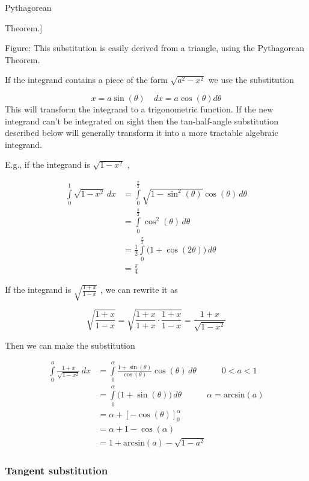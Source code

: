 
Pythagorean

Theorem.]


Figure: This substitution is easily derived from a triangle, using the Pythagorean Theorem.


If the integrand contains a piece of the form $\sqrt{a^2-x^2}$ we use the substitution


\[
x=a\sin(\theta)\quad dx=a\cos(\theta)d\theta
\] This will transform the integrand to a trigonometric function. If the new integrand can't be integrated on sight then the tan-half-angle substitution described below will generally transform it into a more tractable algebraic integrand.


E.g., if the integrand is $\sqrt{1-x^2}$ ,


\begin{align}
\int\limits_0^1\sqrt{1-x^2}\,dx &= \int\limits_0^\frac{\pi}{2}\sqrt{1-\sin^2(\theta)}\cos(\theta)\,d\theta \\&= \int\limits_0^\frac{\pi}{2}\cos^2(\theta)\,d\theta \\&= \tfrac{1}{2}\int\limits_0^\frac{\pi}{2}\bigl(1+\cos(2\theta)\bigr)\,d\theta \\&= \frac{\pi}{4}
\end{align}


If the integrand is $\sqrt{\frac{1+x}{1-x}}$ , we can rewrite it as


\[
\sqrt{\frac{1+x}{1-x}}=\sqrt{\frac{1+x}{1+x}\cdot\frac{1+x}{1-x}}=\frac{1+x}{\sqrt{1-x^2}}
\]

Then we can make the substitution


\begin{align}
\int\limits_0^a\frac{1+x}{\sqrt{1-x^2}}\,dx 
&= \int\limits_0^\alpha\frac{1+\sin(\theta)}{\cos(\theta)}\cos(\theta)\,d\theta \quad\quad\quad 0 < a < 1 \\&= \int\limits_0^\alpha\bigl(1+\sin(\theta)\bigr)\,d\theta \quad\quad\quad \alpha = \text{arcsin}(a) \\&= \alpha + \left[-\cos(\theta)\right] _0^\alpha \\&= \alpha + 1 - \cos(\alpha) \\&= 1 + \text{arcsin}(a) - \sqrt{1-a^2}
\end{align}


\subsubsection{Tangent substitution}
\label{sss:tang-3508}


